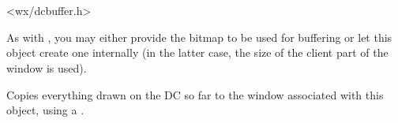 
\\
\\


<wx/dcbuffer.h>



\label{wxbufferedpaintdcctor}


As with , you may either provide the
bitmap to be used for buffering or let this object create one internally (in
the latter case, the size of the client part of the window is used).


\label{wxbufferedpaintdcdtor}

Copies everything drawn on the DC so far to the window associated with this
object, using a .


